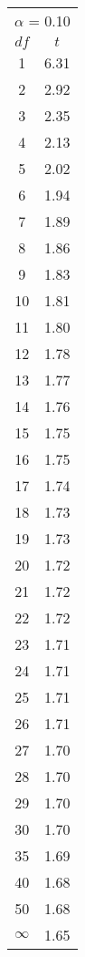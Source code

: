 \begin{tabular}{|c|c|}\hline
 \multicolumn{2}{|c|}{$\alpha$ = 0.10}\\
$df$ & $t$ \\ \hline
1 & 6.31\\
2 & 2.92\\
3 & 2.35\\
4 & 2.13\\
5 & 2.02\\
6 & 1.94\\
7 & 1.89\\
8 & 1.86\\
9 & 1.83\\
10 & 1.81\\
11 & 1.80\\
12 & 1.78\\
13 & 1.77\\
14 & 1.76\\
15 & 1.75\\
16 & 1.75\\
17 & 1.74\\
18 & 1.73\\
19 & 1.73\\
20 & 1.72\\
21 & 1.72\\
22 & 1.72\\
23 & 1.71\\
24 & 1.71\\
25 & 1.71\\
26 & 1.71\\
27 & 1.70\\
28 & 1.70\\
29 & 1.70\\
30 & 1.70\\
35 & 1.69\\
40 & 1.68\\
50 & 1.68\\
$\infty$ & 1.65\\
\hline \end{tabular}

